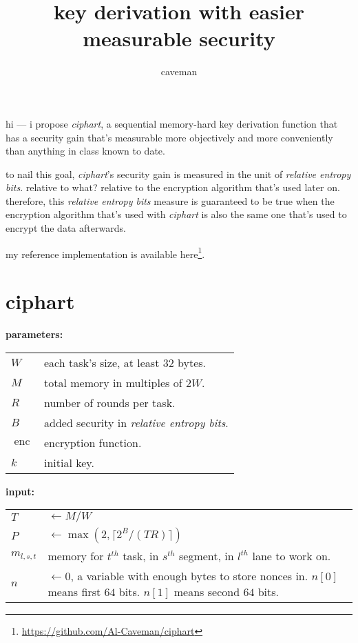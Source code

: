\documentclass{article}
\author{caveman}
\title{key derivation with easier measurable security}
\DeclareMathOperator{\enc}{enc}
\DeclareMathOperator{\maxf}{max}
\begin{document}
\begin{multicols}{2}
\maketitle

hi --- i propose \emph{ciphart}, a sequential memory-hard key derivation
function that has a security gain that's measurable more objectively and
more conveniently than anything in class known to date.

to nail this goal, \emph{ciphart}'s security gain is measured in the unit
of \emph{relative entropy bits}.  relative to what?  relative to the
encryption algorithm that's used later on.  therefore, this \emph{relative
entropy bits} measure is guaranteed to be true when the encryption
algorithm that's used with \emph{ciphart} is also the same one that's used
to encrypt the data afterwards.

my reference implementation is available
here\footnote{\url{https://github.com/Al-Caveman/ciphart}}.

\tableofcontents
\vfill\null
\columnbreak

\section{ciphart}
\noindent\textbf{parameters:}

\begin{tabular}{lp{18em}}
    $W$ & each task's size, at least $32$ bytes.\\
    $M$ & total memory in multiples of $2W$.\\
    $R$ & number of rounds per task.\\
    $B$ & added security in \emph{relative entropy bits}.\\
    $\enc$ & encryption function.\\
    $k$ & initial key.\\
\end{tabular}

\noindent\textbf{input:}

\begin{tabular}{lp{18em}}
    $T$ & $\gets M/W$\\
    $P$ & $\gets \maxf(2, \lceil2^B / (TR)\rceil)$\\
    $m_{l,s,t}$ & memory for $t^{th}$ task, in $s^{th}$ segment, in
    $l^{th}$ lane to work on.\\
    $n$ & $\gets 0$, a variable with enough bytes to store nonces in.
    $n[0]$ means first $64$ bits.  $n[1]$ means second $64$ bits.\\
\end{tabular}


\end{multicols}
\end{document}
